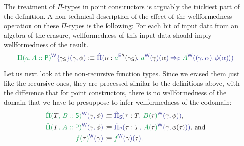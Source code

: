 \begin{defn}
The treatment of $\Pi$-types in point constructors is arguably the trickiest part
of the definition.
A non-technical description of the effect of the wellformedness operation on
these $\Pi$-types is the following:
For each bit of input data from an algebra of the erasure, wellformedness of this
input data should imply wellformedness of the result.
\begin{equation*}
\tqm{\grm{\Pi(a, A :: \Pc)}^\WW\{\blm{\gamma_\Sc}\}(\blgamma, \blphi)}
  :\equiv \tqm{\ExtPi{\blalpha : \tqm{\grm{a}^\EE}^\CC(\gamma_\Sc)}
    { \grm{a}^\WW(\blgamma)(\blalpha)
      \Rightarrow_\Pc \grm{A}^\WW((\gamma, \alpha), \phi(\alpha))}}
\end{equation*}

Let us next look at the non-recursive function types.
Since we erased them just like the recursive ones, they are processed similar to
the definitions above, with the difference that for point constructors, there is
no wellformedness of the domain that we have to presuppose to infer wellformedness
of the codomain:
\begin{align*}
\tqm{\grm{\ExtPi{T}{B :: \Sc}}^\WW(\blgamma, \blphi)}
  &:\equiv \tqm{\ExtPiS{\tau : T}{\grm{B(\bltau)}^\WW(\blgamma, \blphi)}} \text{,} \\
\tqm{\grm{\ExtPi{T}{A :: \Pc}}^\WW(\blgamma, \blphi)}
  &:\equiv \tqm{\ExtPiP{\tau : T}{\grm{A(\bltau)}^\WW(\blgamma, \blm{\phi(\tau)})}}
  \text{, and} \\
\tqm{\grm{f(\bltau)}^\WW(\blgamma)}
  &:\equiv \tqm{\grm{f}^\WW(\blgamma)(\bltau) } \text{.}
\end{align*}


\end{defn}
